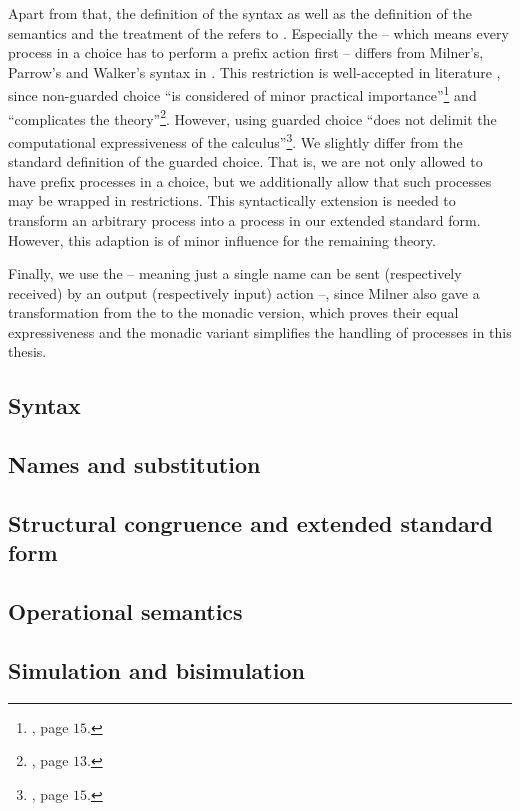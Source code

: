 Apart from that, the definition of the syntax as well as the definition of the semantics and the treatment of the \picalc{} refers to \cite{sangiorgi}. Especially the  -- which means every process in a choice has to perform a prefix action first -- differs from Milner's, Parrow's and Walker's syntax in \cite{milnerParrowWalker}. This restriction is well-accepted in literature \cite{meyer}, since non-guarded choice ``is considered of minor practical importance''\footnote{\cite{meyer}, page $15$.} and ``complicates the theory''\footnote{\cite{sangiorgi}, page $13$.}. However, using guarded choice ``does not delimit the computational expressiveness of the calculus''\footnote{\cite{meyer}, page $15$.}. We slightly differ from the standard definition of the guarded choice. That is, we are not only allowed to have prefix processes in a choice, but we additionally allow that such processes may be wrapped in restrictions. This syntactically extension is needed to transform an arbitrary process into a process in our extended standard form. However, this adaption is of minor influence for the remaining theory.

Finally, we use the  \picalc{} -- meaning just a single name can be sent (respectively received) by an output (respectively input) action --, since Milner also gave a transformation from the  to the monadic version, which proves their equal expressiveness \cite{milner} and the monadic variant simplifies the handling of processes in this thesis.

\subsection{Syntax}
\label{sec_pi_syntax}


\subsection{Names and substitution}
\label{sec_pi_names_substitution}


\subsection{Structural congruence and extended standard form}
\label{sec_pi_struct_cong}


\subsection{Operational semantics}
\label{sec_pi_op_sem}


\subsection{Simulation and bisimulation}
\label{sec_pi_simulation}

